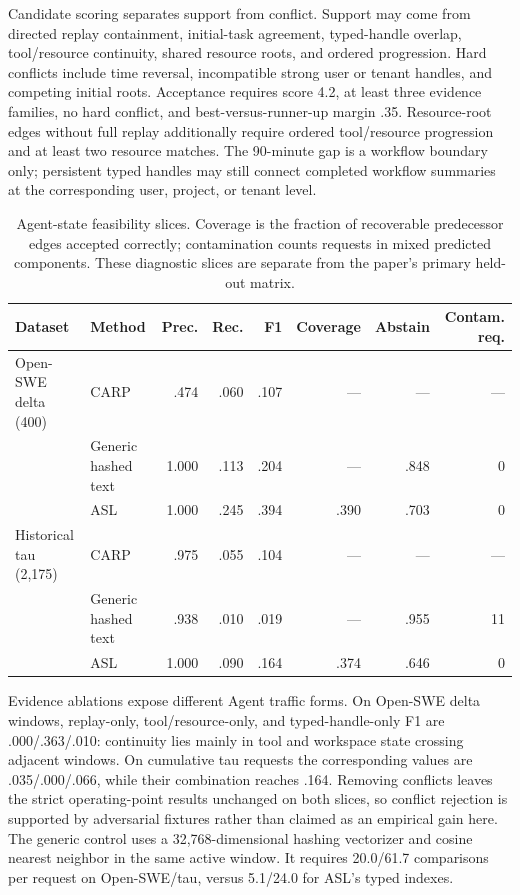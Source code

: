 \documentclass[letterpaper]{article} %
\newcommand{\asl}{\textsc{ASL}\xspace}
\begin{document}
Candidate scoring separates support from conflict. Support may come from directed replay
containment, initial-task agreement, typed-handle overlap, tool/resource continuity, shared resource
roots, and ordered progression. Hard conflicts include time reversal, incompatible strong user or
tenant handles, and competing initial roots. Acceptance requires score 4.2, at least three evidence
families, no hard conflict, and best-versus-runner-up margin .35. Resource-root edges without full
replay additionally require ordered tool/resource progression and at least two resource matches.
The 90-minute gap is a workflow boundary only; persistent typed handles may still connect completed
workflow summaries at the corresponding user, project, or tenant level.

\begin{table}[t]
\centering
\small
\begin{tabular}{@{}llrrrrrr@{}}
\toprule
Dataset & Method & Prec. & Rec. & F1 & Coverage & Abstain & Contam. req. \\
\midrule
Open-SWE delta (400) & CARP & .474 & .060 & .107 & --- & --- & --- \\
 & Generic hashed text & 1.000 & .113 & .204 & --- & .848 & 0 \\
 & ASL & 1.000 & .245 & .394 & .390 & .703 & 0 \\
Historical tau (2,175) & CARP & .975 & .055 & .104 & --- & --- & --- \\
 & Generic hashed text & .938 & .010 & .019 & --- & .955 & 11 \\
 & ASL & 1.000 & .090 & .164 & .374 & .646 & 0 \\
\bottomrule
\end{tabular}
\caption{Agent-state feasibility slices. Coverage is the fraction of recoverable predecessor edges
accepted correctly; contamination counts requests in mixed predicted components. These diagnostic
slices are separate from the paper's primary held-out matrix.}
\end{table}

Evidence ablations expose different Agent traffic forms. On Open-SWE delta windows, replay-only,
tool/resource-only, and typed-handle-only F1 are .000/.363/.010: continuity lies mainly in tool and
workspace state crossing adjacent windows. On cumulative tau requests the corresponding values are
.035/.000/.066, while their combination reaches .164. Removing conflicts leaves the strict
operating-point results unchanged on both slices, so conflict rejection is supported by adversarial
fixtures rather than claimed as an empirical gain here. The generic control uses a 32,768-dimensional
hashing vectorizer and cosine nearest neighbor in the same active window. It requires 20.0/61.7
comparisons per request on Open-SWE/tau, versus 5.1/24.0 for \asl's typed indexes.
\end{document}
